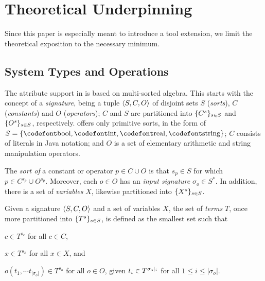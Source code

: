 \section{Theoretical Underpinning}
\label{sec:background}

Since this paper is especially meant to introduce a tool extension, we limit the theoretical exposition to the necessary minimum.
%

\subsection{System Types and Operations}
\label{sec:system}

The attribute support in \GROOVE is based on multi-sorted algebra. This starts with the concept of a \emph{signature}, being a tuple $\langle{S,C,O}\rangle$ of disjoint sets $S$ (\emph{sorts}), $C$ (\emph{constants}) and $O$ (\emph{operators}); $C$ and $S$ are partitioned into $\{{C^s}\}_{s\in S}$ and $\{{O^s}\}_{s\in S}$, respectively. \GROOVE offers only primitive sorts, in the form of $S=\setof{\boolS,\intS,\realS,\stringS}$; $C$ consists of literals in Java notation; and $O$ is a set of elementary arithmetic and string manipulation operators.

The \emph{sort of} a constant or operator $p\in C\cup O$ is that $s_p\in S$ for which $p\in C^{s_p}\cup O^{s_p}$. Moreover, each $o\in O$ has an \emph{input signature} $\sigma_o\in S^*$. In addition, there is a set of \emph{variables} $X$, likewise partitioned into $\{{X^s}\}_{s\in S}$.

Given a signature $\langle{S,C,O}\rangle$ and a set of variables $X$, the set of \emph{terms} $T$, once more partitioned into $\{{T^s}\}_{s\in S}$, is defined as the smallest set such that
%
\begin{inumerate}
\item $c\in T^{s_c}$ for all $c\in C$,
\item $x\in T^{s_x}$ for all $x\in X$, and
\item $o(t_1,\cdots t_{|\sigma_o|})\in T^{s_o}$ for all $o\in O$, given $t_i\in T^{\sigma_o{|_{i}}}$ for all $1\leq i\leq |\sigma_o|$.
\end{inumerate}
%

